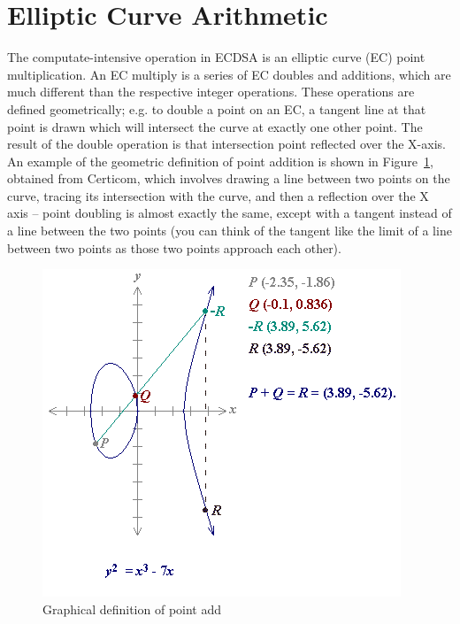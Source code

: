 \documentclass[twocolumn]{article}
\begin{document}
\section{Elliptic Curve Arithmetic}

The computate-intensive operation in ECDSA is an elliptic curve (EC)
point multiplication. An EC multiply is a series of EC doubles and
additions, which are much different than the respective integer
operations. These operations are defined geometrically; e.g. to double
a point on an EC, a tangent line at that point is drawn which will
intersect the curve at exactly one other point. The result of the
double operation is that intersection point reflected over the X-axis.
An example of the geometric definition of point addition is shown in
Figure~\ref{point-add-graph}, obtained from Certicom, which involves 
drawing a line between two points on the curve, tracing its intersection with the curve, and then a reflection over the X axis -- point doubling is almost exactly
the same, except with a tangent instead of a line between the two
points (you can think of the tangent like the limit of a line between
two points as those two points approach each other).

\begin{figure}[ht]
  \begin{center}
    \includegraphics[width=0.9\linewidth]{point_add.png}
  \end{center}

  \caption{Graphical definition of point add
    \label{point-add-graph}}
\end{figure}
\end{document}
